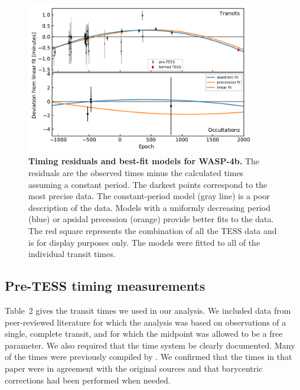 \documentclass[12pt,twocolumn,tighten]{aastex62}
\begin{document}
\begin{figure}[t]
	\begin{center}
		\leavevmode
		\includegraphics[width=0.9\textwidth]{f4.pdf}
	\end{center}
	\vspace{-0.5cm}
	\caption{ {\bf Timing residuals and best-fit models for WASP-4b.}
		The residuals are the observed times minus the calculated times
		assuming a constant period.  The darkest points correspond to
		the most precise data. The constant-period model (gray line) is
		a poor description of the data.  Models with a uniformly
		decreasing period (blue) or apsidal precession (orange) provide
		better fits to the data.  The red square represents the
		combination of all the TESS data and is for display purposes
		only.  The models were fitted to all of the individual transit
		times.
		\label{fig:times}
	}
\end{figure}


\subsection{Pre-TESS timing measurements}
\label{subsec:times}

Table~2 gives the transit times we used in our analysis. We included
data from peer-reviewed literature for which the analysis was based on
observations of a single, complete transit, and for which the midpoint
was allowed to be a free parameter. We also required that the time
system be clearly documented. Many of the times were previously
compiled by \citet{hoyer_tramos_2013}. We confirmed that the times in
that paper were in agreement with the original sources and that
barycentric corrections had been performed when needed.
\end{document}
